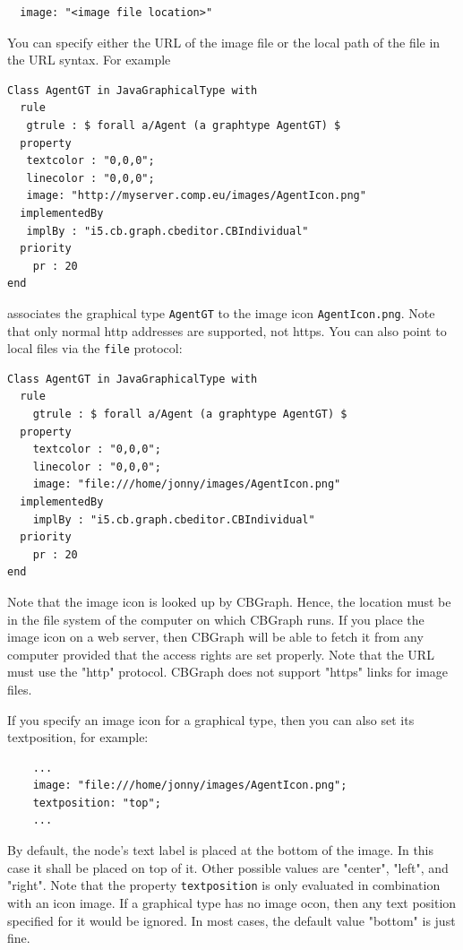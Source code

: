 {\small
\begin{verbatim}
  image: "<image file location>"
\end{verbatim}
}

You can specify either the URL of the image file or the local path of the file in the URL syntax.
For example

{\small
\begin{verbatim}
Class AgentGT in JavaGraphicalType with
  rule
   gtrule : $ forall a/Agent (a graphtype AgentGT) $
  property
   textcolor : "0,0,0";
   linecolor : "0,0,0";
   image: "http://myserver.comp.eu/images/AgentIcon.png"
  implementedBy
   implBy : "i5.cb.graph.cbeditor.CBIndividual"
  priority
    pr : 20
end
\end{verbatim}
}

associates the graphical type {\tt AgentGT} to the image icon {\tt AgentIcon.png}. Note that
only normal http addresses are supported, not https.
You can also point to local files via the {\tt file} protocol:

{\small
\begin{verbatim}
Class AgentGT in JavaGraphicalType with
  rule
    gtrule : $ forall a/Agent (a graphtype AgentGT) $
  property
    textcolor : "0,0,0";
    linecolor : "0,0,0";
    image: "file:///home/jonny/images/AgentIcon.png"
  implementedBy
    implBy : "i5.cb.graph.cbeditor.CBIndividual"
  priority
    pr : 20
end
\end{verbatim}
}

Note that the image icon is looked up by CBGraph. Hence, the location must be 
in the file system of the computer on which CBGraph runs. If you place the image
icon on a web server, then CBGraph will be able to fetch it from any computer
provided that the access rights are set properly. Note that the URL must use the "http"
protocol. CBGraph does not support "https" links for image files.

If you specify an image icon for a graphical type, then you can also set its
textposition, for example:

{\small
\begin{verbatim}
    ...
    image: "file:///home/jonny/images/AgentIcon.png";
    textposition: "top";
    ...
\end{verbatim}
}

By default, the node's text label is placed at the bottom of the image. In this
case it shall be placed on top of it. Other possible values are "center", "left",
and "right". Note that the property {\tt textposition} is only evaluated in combination
with an icon image. If a graphical type has no image ocon, then any text position
specified for it would be ignored.
In most cases, the default value "bottom" is just fine.

